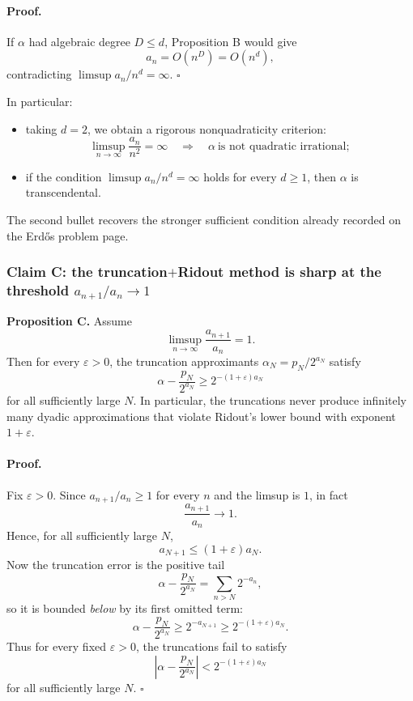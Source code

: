 \paragraph{Proof.}
If $\alpha$ had algebraic degree $D\le d$, Proposition B would give
\[
a_n=O(n^D)=O(n^d),
\]
contradicting $\limsup a_n/n^d=\infty$.
\hfill$\square$

\medskip
In particular:

\begin{itemize}
\item taking $d=2$, we obtain a rigorous nonquadraticity criterion:
\[
\limsup_{n\to\infty}\frac{a_n}{n^2}=\infty
\quad\Longrightarrow\quad
\alpha\ \text{is not quadratic irrational};
\]
\item if the condition $\limsup a_n/n^d=\infty$ holds for every $d\ge 1$, then $\alpha$ is transcendental.
\end{itemize}
The second bullet recovers the stronger sufficient condition already recorded on the Erd\H{o}s problem page.

\subsubsection*{Claim C: the truncation$+$Ridout method is sharp at the threshold $a_{n+1}/a_n\to 1$}
\textbf{Proposition C.}
Assume
\[
\limsup_{n\to\infty}\frac{a_{n+1}}{a_n}=1.
\]
Then for every $\varepsilon>0$, the truncation approximants $\alpha_N=p_N/2^{a_N}$ satisfy
\[
\alpha-\frac{p_N}{2^{a_N}}\ge 2^{-(1+\varepsilon)a_N}
\]
for all sufficiently large $N$.
In particular, the truncations never produce infinitely many dyadic approximations that violate Ridout's lower bound with exponent $1+\varepsilon$.

\paragraph{Proof.}
Fix $\varepsilon>0$. Since $a_{n+1}/a_n\ge 1$ for every $n$ and the limsup is $1$, in fact
\[
\frac{a_{n+1}}{a_n}\to 1.
\]
Hence, for all sufficiently large $N$,
\[
a_{N+1}\le (1+\varepsilon)a_N.
\]
Now the truncation error is the positive tail
\[
\alpha-\frac{p_N}{2^{a_N}}=\sum_{n>N}2^{-a_n},
\]
so it is bounded \emph{below} by its first omitted term:
\[
\alpha-\frac{p_N}{2^{a_N}}\ge 2^{-a_{N+1}}\ge 2^{-(1+\varepsilon)a_N}.
\]
Thus for every fixed $\varepsilon>0$, the truncations fail to satisfy
\[
\left|\alpha-\frac{p_N}{2^{a_N}}\right|<2^{-(1+\varepsilon)a_N}
\]
for all sufficiently large $N$.
\hfill$\square$

